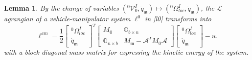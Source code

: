\documentclass[lettersize,journal]{IEEEtran}
\def \m  {\mathfrak{m}}
\def \V {\mathcal{V}}
\def \L {\mathcal{L}}
\def \A {\mathcal{A}}
\def \O {{}^0\Omega^I_{loc}}
\newtheorem{lemma}{Lemma}
\theoremstyle{remark}
\begin{document}
\begin{lemma}
By the change of variables $(^0\V^I_0,\dot q_\m) \mapsto (\O,\dot q_\m)$, the $\L$agrangian of a vehicle-manipulator system $\ell^0$ in \eqref{l0} transforms into %
\begin{equation}
    \ell^{cm}=
    \frac{1}{2}\begin{bmatrix}\O\\\dot{q}_\mathfrak{m}\end{bmatrix}^T \begin{bmatrix}M_0 & \mathbb{O}_{b\times n}\\ \mathbb{O}_{n\times b} & M_\mathfrak{m}-\A^TM_0\A\end{bmatrix} \begin{bmatrix}\O\\\dot{q}_\mathfrak{m}\end{bmatrix}-u.
\end{equation}
with a block-diagonal mass matrix for expressing the kinetic energy of the system.
\end{lemma}
\end{document}
